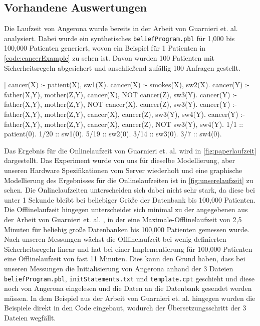 \documentclass[german,version-2020-11]{uzl-thesis}
\begin{document}
\subsection{Vorhandene Auswertungen}
Die Laufzeit von Angerona wurde bereits in der Arbeit von Guarnieri et. al. \cite{guarnieri2017securing} analysiert. Dabei wurde ein synthetisches \texttt{beliefProgram.pbl} für 1,000 bis 100,000 Patienten generiert, wovon ein Beispiel für 1 Patienten in \autoref{code:cancerExample} zu sehen ist. Davon wurden 100 Patienten mit Sicherheitsregeln abgesichert und anschließend zufällig 100 Anfragen gestellt. \\ 
\begin{Pseudocode}[caption={\texttt{beliefProgram.pbl} für das Beispiel aus \cite{6}}, label={code:cancerExample}]]
cancer(X) :- patient(X), sw1(X).
cancer(X) :- smokes(X), sw2(X).
cancer(Y) :- father(X,Y), mother(Z,Y), cancer(X), NOT cancer(Z), sw3(Y).
cancer(Y) :- father(X,Y), mother(Z,Y), NOT cancer(X), cancer(Z), sw3(Y).
cancer(Y) :- father(X,Y), mother(Z,Y), cancer(X), cancer(Z), sw3(Y), sw4(Y).
cancer(Y) :- father(X,Y), mother(Z,Y), cancer(X), cancer(Z), NOT sw3(Y), sw4(Y).
1/1 :: patient(0).
1/20 :: sw1(0).
5/19 :: sw2(0).
3/14 :: sw3(0).
3/7 :: sw4(0).
\end{Pseudocode}
Das Ergebnis für die Onlinelaufzeit von Guarnieri et. al. \cite{guarnieri2017securing} wird in \autoref{fig:paperlaufzeit} dargestellt. Das Experiment wurde von uns für dieselbe Modellierung, aber unseren Hardware Spezifikationen vom Server wiederholt und eine graphische Modellierung des Ergebnisses für die Onlinelaufzeiten ist in \autoref{fig:unserelaufzeit} zu sehen. Die Onlinelaufzeiten unterscheiden sich dabei nicht sehr stark, da diese bei unter 1 Sekunde bleibt bei beliebiger Größe der Datenbank bis 100,000 Patienten. \\
Die Offlinelaufzeit hingegen unterscheidet sich minimal zu der angegebenen aus der Arbeit von Guarnieri et. al. \cite{guarnieri2017securing}, in der eine Maximale-Offlinelaufzeit von 2,5 Minuten für beliebig große Datenbanken bis 100,000 Patienten gemessen wurde. Nach unseren Messungen wächst die Offlinelaufzeit bei wenig definierten Sicherheitsregeln linear und hat bei einer Implementierung für 100,000 Patienten eine Offlinelaufzeit von fast 11 Minuten. Dies kann den Grund haben, dass bei unseren Messungen die Initialisierung von Angerona anhand der 3 Dateien \texttt{beliefProgram.pbl}, \texttt{initStatements.txt} und \texttt{template.cpt} geschieht und diese noch von Angerona eingelesen und die Daten an die Datenbank gesendet werden müssen. In dem Beispiel aus der Arbeit von Guarnieri et. al. \cite{guarnieri2017securing} hingegen wurden die Beispiele direkt in den Code eingebaut, wodurch der Übersetzungsschritt der 3 Dateien wegfällt.\\  
\end{document}
